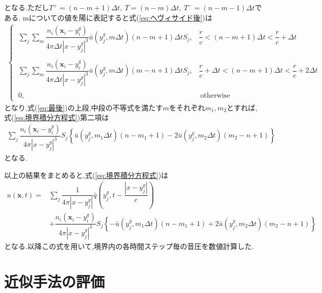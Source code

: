 \documentclass[dvipdfmx]{ampbt}
\begin{document}
となる.ただし$T^+ =(n-m+1)\Delta t,\ T =(n-m)\Delta t,\ T^- =(n-m-1)\Delta t$である.
mについての値を陽に表記すると式(\ref{eq:ヘヴィサイド後})は
\begin{align}
\begin{cases}
  \label{eq:最後}
\; \displaystyle\sum_j \sum_m \dfrac{n_i(\bm{x}_i-y^g_i)}{4\pi \Delta t |x-y^g_j|^3}  \bar{u}(y^g_j,m\Delta t)(n-m+1)\Delta t S_j, &\dfrac{r}{c} < (n-m+1)\Delta t < \dfrac{r}{c}+\Delta t \\  \\
\; \displaystyle\sum_j \sum_m \dfrac{n_i(\bm{x}_i-y^g_i)}{4\pi \Delta t |x-y^g_j|^3}  \bar{u}(y^g_j,m\Delta t)(m-n+1)\Delta t S_j, &\dfrac{r}{c}+\Delta t < (n-m+1)\Delta t < \dfrac{r}{c}+2\Delta t\\  \\
\; 0, &\ \mbox{otherwise}
\end{cases}
\end{align}
となり,式(\ref{eq:最後})の上段,中段の不等式を満たす$m$をそれぞれ$m_1,m_2$とすれば,式(\ref{eq:境界積分方程式})第二項は
\begin{align}
\label{eq:最後の最後}
\displaystyle\sum_j \dfrac{n_i(\bm{x}_i-y^g_i)}{4\pi |x-y^g_j|^3} S_j \left\{  \bar{u}(y^g_j,m_1\Delta t)(n-m_1+1)
-2 \bar{u}(y^g_j,m_2\Delta t)(m_2-n+1)\right\}
\end{align}
となる.\par
以上の結果をまとめると,式(\ref{eq:境界積分方程式})は
\begin{align}
\label{eq:境界積分方程式の変形後}
u(\bm{x},t) = &\sum_j  \dfrac{1}{4\pi|x-y_j^g|} \bar{q}(y_j^g,t-\dfrac{|x-y_j^g|}{c}) \nonumber\\
 &+ \dfrac{n_i(\bm{x}_i-y^g_i)}{4\pi |x-y^g_j|^3} S_j \left\{  -\bar{u}(y^g_j,m_1\Delta t)(n-m_1+1)
 +2 \bar{u}(y^g_j,m_2\Delta t)(m_2-n+1)\right\}
\end{align}
となる.以降この式を用いて,境界内の各時間ステップ毎の音圧を数値計算した.




\section{近似手法の評価}
\end{document}
